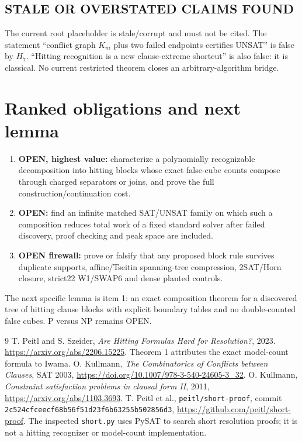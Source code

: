 \documentclass[11pt]{article}
\begin{document}
\subsection*{STALE OR OVERSTATED CLAIMS FOUND}
The current root placeholder is stale/corrupt and must not be cited.  The statement
``conflict graph $K_m$ plus two failed endpoints certifies UNSAT'' is false by
$H_7$.  ``Hitting recognition is a new clause-extreme shortcut'' is also false:
it is classical.  No current restricted theorem closes an arbitrary-algorithm
bridge.

\section{Ranked obligations and next lemma}
\begin{enumerate}
\item \textbf{OPEN, highest value:} characterize a polynomially recognizable
decomposition into hitting blocks whose exact false-cube counts compose through
charged separators or joins, and prove the full construction/continuation cost.
\item \textbf{OPEN:} find an infinite matched SAT/UNSAT family on which such a
composition reduces total work of a fixed standard solver after failed discovery,
proof checking and peak space are included.
\item \textbf{OPEN firewall:} prove or falsify that any proposed block rule survives
duplicate supports, affine/Tseitin spanning-tree compression, 2SAT/Horn closure,
strict22 W1/SWAP6 and dense planted controls.
\end{enumerate}
The next specific lemma is item 1: an exact composition theorem for a discovered
tree of hitting clause blocks with explicit boundary tables and no double-counted
false cubes.  P versus NP remains OPEN.

\begin{thebibliography}{9}
 T. Peitl and S. Szeider,
\emph{Are Hitting Formulas Hard for Resolution?}, 2023.
\url{https://arxiv.org/abs/2206.15225}.
Theorem 1 attributes the exact model-count formula to Iwama.
 O. Kullmann,
\emph{The Combinatorics of Conflicts between Clauses}, SAT 2003,
\url{https://doi.org/10.1007/978-3-540-24605-3_32}.
 O. Kullmann,
\emph{Constraint satisfaction problems in clausal form II}, 2011,
\url{https://arxiv.org/abs/1103.3693}.
 T. Peitl et al., \texttt{peitl/short-proof}, commit
\texttt{2c524cfceecf68b56f51d23f6b63255b502856d3},
\url{https://github.com/peitl/short-proof}.
The inspected \texttt{short.py} uses PySAT to search short resolution proofs; it
is not a hitting recognizer or model-count implementation.
\end{thebibliography}
\end{document}
